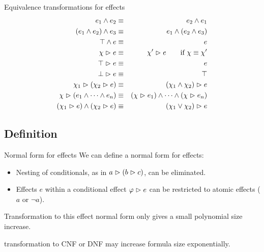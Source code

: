 \documentclass{gkibeamer}
\begin{document}
\begin{frame}{Equivalence transformations for effects}
  \begin{eqnarray}
    e_1 \land e_2 & \equiv & e_2 \land e_1 \\
    (e_1 \land e_2) \land e_3 & \equiv & e_1 \land (e_2 \land e_3) \\
    \top \land e & \equiv & e \\
    \chi \vartriangleright e & \equiv & \chi' \vartriangleright e \qquad \text{if~} \chi \equiv \chi' \\
    \top \vartriangleright e & \equiv & e \\
    \bot \vartriangleright e & \equiv & \top \\
    \chi_1 \vartriangleright (\chi_2 \vartriangleright e) & \equiv & (\chi_1 \land \chi_2) \vartriangleright e \\
    \chi \vartriangleright (e_1 \land \dots \land e_n) & \equiv &
    (\chi \vartriangleright e_1) \land \dots \land (\chi \vartriangleright e_n) \\
    (\chi_1 \vartriangleright e) \land (\chi_2 \vartriangleright e) & \equiv & (\chi_1 \lor \chi_2) \vartriangleright e
  \end{eqnarray}
\end{frame}

\subsection{Definition}
\begin{frame}{Normal form for effects}
  We can define a \alert{normal form for effects}:

  \begin{itemize}
  \item Nesting of conditionals, as in $a \vartriangleright (b \vartriangleright c)$, can be
    eliminated.
  \item Effects $e$ within a conditional effect $\varphi \vartriangleright e$ can be
    restricted to atomic effects ($a$ or $\neg a$).
  \end{itemize}

  Transformation to this effect normal form only gives a small polynomial size
  increase. 
  \medskip

   transformation to CNF or DNF may increase formula
  size exponentially.
\end{frame}
\end{document}
